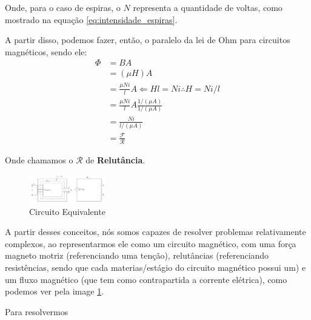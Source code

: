\documentclass{article}
\newcommand{\n}{\nonumber \\ }
\begin{document}
Onde, para o caso de espiras, o $N$ representa a quantidade de voltas, como mostrado na equação \ref{eq:intensidade_espiras}.

A partir disso, podemos fazer, então, o paralelo da lei de Ohm para circuitos magnéticos, sendo ele:
\begin{align}
    \Phi &= B A \n 
         &= (\mu H) A \n 
         &= \frac{\mu N i}{l} A \Leftarrow Hl = Ni \therefore H = Ni/l \n
         &= \frac{\mu N i}{l} A \frac{1/(\mu A)}{1/(\mu A)} \n
         &= \frac{N i}{l/(\mu A)} \n
         &= \frac{\mathcal{F}}{\mathcal{R}}
\end{align}

Onde chamamos o $\mathcal{R}$ de \textbf{Relutância}.

\begin{figure}
    \centering
    \includegraphics[width=0.3\textwidth]{imgs/circuito_equivalente.png}
    \caption{Circuito Equivalente}
    \label{img:circuito_equivalente}
\end{figure}

A partir desses conceitos, nós somos capazes de resolver problemas relativamente complexos, ao representarmos ele como um circuito magnético, com uma força magneto motriz (referenciando uma tenção), relutâncias (referenciando resistências, sendo que cada materias/estágio do circuito magnético possui um) e um fluxo magnético (que tem como contrapartida a corrente elétrica), como podemos ver pela image \ref{img:circuito_equivalente}.

Para resolvermos 
\end{document}
